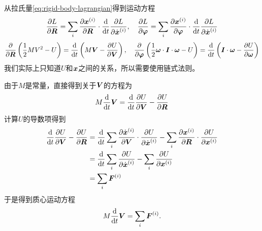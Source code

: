 从拉氏量\eqref{eq:rigid-body-lagrangian}得到运动方程
\[
    \pdv{L}{\vb*{R}} = \sum_i \pdv{\vb*{x}^{(i)}}{\vb*{R}} \cdot \dv{t} \pdv{L}{\dot{\vb*{x}}^{(i)}}, \quad \pdv{L}{\vb*{\varphi}} = \sum_i \pdv{\vb*{x}^{(i)}}{\vb*{\varphi}} \cdot \dv{t} \pdv{L}{\dot{\vb*{x}}^{(i)}}
\]
\[
    \pdv{\vb*{R}} \left( \frac{1}{2} M V^2 - U \right) = \dv{t} \left(M \vb*{V} - \pdv{U}{\vb*{V}}\right), \quad \pdv{\vb*{\varphi}} \left( \frac{1}{2} \vb*{\omega} \cdot \vb*{I} \cdot \vb*{\omega} - U \right) = \dv{t} \left( \vb*{I} \cdot \vb*{\omega} - \pdv{U}{\vb*{\omega}} \right)
\]
我们实际上只知道$U$和$\vb*{x}$之间的关系，所以需要使用链式法则。

由于$M$是常量，直接得到关于$\vb*{V}$的方程为
\[
    M \dv{t} \vb*{V} = \dv{t} \pdv{U}{\vb*{V}} - \pdv{U}{\vb*{R}}
\]
计算$U$的导数项得到
\[
    \begin{aligned}
        \dv{t} \pdv{U}{\vb*{V}} - \pdv{U}{\vb*{R}} &=
        \dv{t} \sum_i \pdv{\dot{\vb*{x}}^{(i)}}{\vb*{V}} \cdot \pdv{U}{\dot{\vb*{x}}^{(i)}} 
        - \sum_i \pdv{\vb*{x}^{(i)}}{\vb*{R}} \cdot \pdv{U}{\vb*{x}^{(i)}}  \\
        &= \dv{t} \sum_i \pdv{U}{\dot{\vb*{x}}^{(i)}} - \sum_i \pdv{U}{\vb*{x}^{(i)}} \\
        &= \sum_i \vb*{F}^{(i)}
    \end{aligned}
\]
于是得到质心运动方程
\begin{equation}
    M \dv{t} \vb*{V} = \sum_i \vb*{F}^{(i)}.
    \label{eq:mass-center-motion}
\end{equation}

